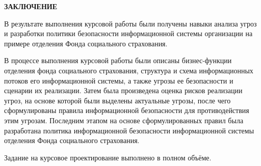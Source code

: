 \newpage
\begin{center}
  \Large{\textbf{ЗАКЛЮЧЕНИЕ}}
\end{center}

В результате выполнения курсовой работы были получены навыки анализа
угроз и разработки политики безопасности  информационной системы
организации на примере отделения Фонда социального страхования.

В процессе выполнения курсовой работы были описаны бизнес-функции
отделения фонда социального страхования, структура и схема
информационных потоков его информационной системы, а также угрозы ее
безопасности и сценарии их реализации. Затем была произведена оценка
рисков реализации угроз, на основе которой были выделены актуальные
угрозы, после чего сформулированы правила информационной безопасности
для противодействия этим угрозам. Последним этапом на основе
сформулированных правил была разработана политика информационной
безопасности информационной системы отделения Фонда социального
страхования.

Задание на курсовое проектирование выполнено в полном объёме.

\newpage
